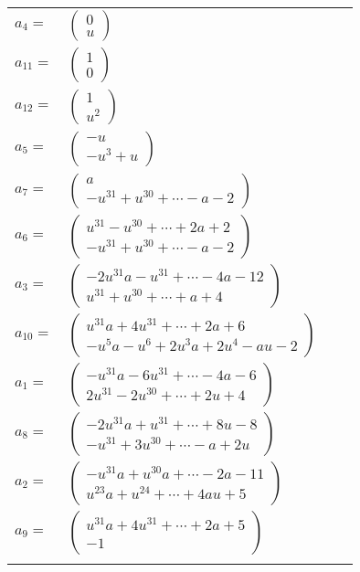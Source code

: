 \documentclass[1p]{elsarticle_modified}
\theoremstyle{definition}
\begin{document}
\begin{tabular}{m{7pt} m{180pt} m{7pt} m{180pt} }
\flushright $a_{4}=$&$\begin{pmatrix}0\\u\end{pmatrix}$ \\
\flushright $a_{11}=$&$\begin{pmatrix}1\\0\end{pmatrix}$ \\
\flushright $a_{12}=$&$\begin{pmatrix}1\\u^2\end{pmatrix}$ \\
\flushright $a_{5}=$&$\begin{pmatrix}- u\\- u^3+u\end{pmatrix}$ \\
\flushright $a_{7}=$&$\begin{pmatrix}a\\- u^{31}+u^{30}+\cdots- a-2\end{pmatrix}$ \\
\flushright $a_{6}=$&$\begin{pmatrix}u^{31}- u^{30}+\cdots+2 a+2\\- u^{31}+u^{30}+\cdots- a-2\end{pmatrix}$ \\
\flushright $a_{3}=$&$\begin{pmatrix}-2 u^{31} a- u^{31}+\cdots-4 a-12\\u^{31}+u^{30}+\cdots+a+4\end{pmatrix}$ \\
\flushright $a_{10}=$&$\begin{pmatrix}u^{31} a+4 u^{31}+\cdots+2 a+6\\- u^5 a- u^6+2 u^3 a+2 u^4- a u-2\end{pmatrix}$ \\
\flushright $a_{1}=$&$\begin{pmatrix}- u^{31} a-6 u^{31}+\cdots-4 a-6\\2 u^{31}-2 u^{30}+\cdots+2 u+4\end{pmatrix}$ \\
\flushright $a_{8}=$&$\begin{pmatrix}-2 u^{31} a+u^{31}+\cdots+8 u-8\\- u^{31}+3 u^{30}+\cdots- a+2 u\end{pmatrix}$ \\
\flushright $a_{2}=$&$\begin{pmatrix}- u^{31} a+u^{30} a+\cdots-2 a-11\\u^{23} a+u^{24}+\cdots+4 a u+5\end{pmatrix}$ \\
\flushright $a_{9}=$&$\begin{pmatrix}u^{31} a+4 u^{31}+\cdots+2 a+5\\-1\end{pmatrix}$\\&\end{tabular}
\end{document}
